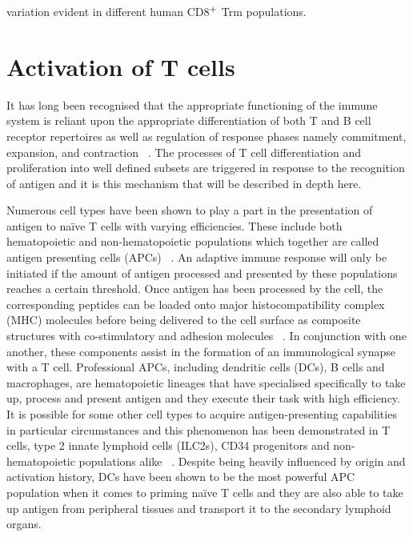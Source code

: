 variation evident in different human CD8$\textsuperscript{+}$ Trm populations. 

\section{Activation of T cells}

It has long been recognised that the appropriate functioning of the immune system is reliant upon the appropriate differentiation of both T and B cell receptor repertoires as well as regulation of response phases namely commitment, expansion, and contraction ~\autocite{Bur2015}. The processes of T cell differentiation and proliferation into well defined subsets are triggered in response to the recognition of antigen and it is this mechanism that will be described in depth here. 

Numerous cell types have been shown to play a part in the presentation of antigen to na\"ive T cells with varying efficiencies. These include both hematopoietic and non-hematopoietic populations which together are called antigen presenting cells (APCs) ~\autocite{Cha2007}. An adaptive immune response will only be initiated if the amount of antigen processed and presented by these populations reaches a certain threshold. Once antigen has been processed by the cell, the corresponding peptides can be loaded onto major histocompatibility complex (MHC) molecules before being delivered to the cell surface as composite structures with co-stimulatory and adhesion molecules ~\autocite{Cha2007}. In conjunction with one another, these components assist in the formation of an immunological synapse with a T cell. Professional APCs, including dendritic cells (DCs), B cells and macrophages, are hematopoietic lineages that have specialised specifically to take up, process and present antigen and they execute their task with high efficiency. It is possible for some other cell types to acquire antigen-presenting capabilities in particular circumstances and this phenomenon has been demonstrated in T cells, type 2 innate lymphoid cells (ILC2s), CD34 progenitors and non-hematopoietic populations alike ~\autocite{Bur2015,Cha2007,Igy2013}. Despite being heavily influenced by origin and activation history, DCs have been shown to be the most powerful APC population when it comes to priming na\"ive T cells and they are also able to take up antigen from peripheral tissues and transport it to the secondary lymphoid organs. 

